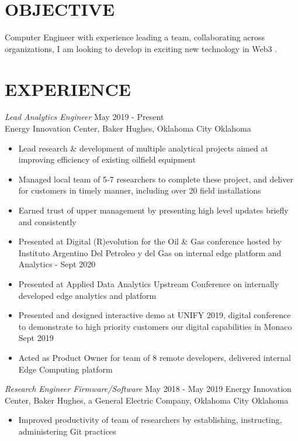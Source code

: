 \documentclass[line,margin]{res}
\begin{document}
\address{sammgtanner@gmail.com}
\address{(405) 318-6956}


\begin{resume}

	\section{OBJECTIVE}
	Computer Engineer with experience leading a team, collaborating across organizations, I am looking to develop in exciting new technology in Web3 .

	\section{EXPERIENCE}
	 {\sl Lead Analytics Engineer} \hfill May 2019 - Present \\
	Energy Innovation Center, Baker Hughes, Oklahoma City Oklahoma
	\begin{itemize} \itemsep -2pt
		\item Lead research \& development of multiple analytical projects aimed at improving efficiency of existing oilfield equipment
		\item Managed local team of 5-7 researchers to complete these project, and deliver for customers in timely manner, including over 20 field installations
		\item Earned trust of upper management by presenting high level updates briefly and consistently
		\item Presented at Digital (R)evolution for the Oil \& Gas conference hosted by Instituto Argentino Del Petroleo y del Gas on internal edge platform and Analytics - Sept 2020
		\item Presented at Applied Data Analytics Upstream Conference on internally developed edge analytics and platform
		\item Presented and designed interactive demo at UNIFY 2019, digital conference to demonstrate to high priority customers our digital capabilities in Monaco Sept 2019
		\item Acted as Product Owner for team of 8 remote developers, delivered internal Edge Computing platform
	\end{itemize}
	{\sl Research Engineer Firmware/Software} \hfill May 2018 - May 2019
	Energy Innovation Center, Baker Hughes, a General Electric Company, Oklahoma City Oklahoma
	\begin{itemize} \itemsep -2pt
		\item Improved productivity of team of researchers by establishing, instructing, administering Git practices

\end{itemize}
\end{resume}
\end{document}
